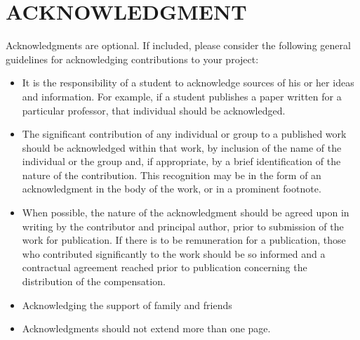 \chapter*{ACKNOWLEDGMENT}

Acknowledgments are optional. If included, please consider the following general guidelines for acknowledging contributions to your project:

\begin{itemize}
\item It is the responsibility of a student to acknowledge sources of his or her ideas and information. For example, if a student publishes a paper written for a particular professor, that individual should be acknowledged.

\item The significant contribution of any individual or group to a published work should be acknowledged within that work, by inclusion of the name of the individual or the group and, if appropriate, by a brief identification of the nature of the contribution. This recognition may be in the form of an acknowledgment in the body of the work, or in a prominent footnote. 

\item When possible, the nature of the acknowledgment should be agreed upon in writing by the contributor and principal author, prior to submission of the work for publication. If there is to be remuneration for a publication, those who contributed significantly to the work should be so informed and a contractual agreement reached prior to publication concerning the distribution of the compensation.

\item Acknowledging the support of family and friends

\item Acknowledgments should not extend more than one page.

\end{itemize}